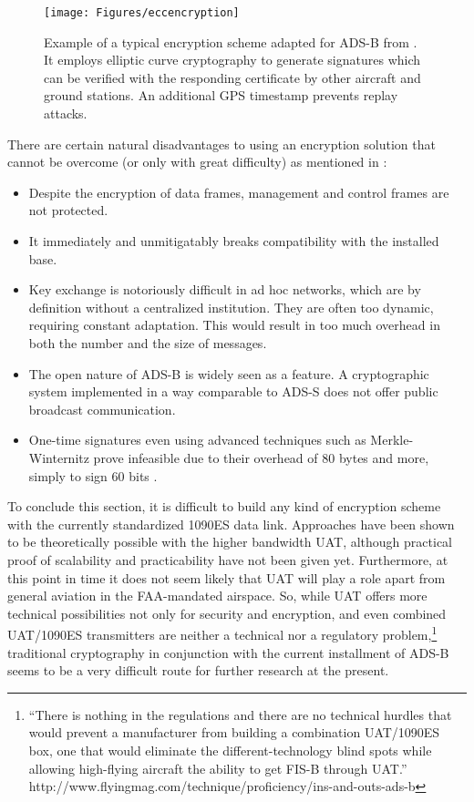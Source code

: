\documentclass[english]{IEEEtran}
\begin{document}
\begin{figure}
\texttt{[image: Figures/eccencryption]}

\caption{Example of a typical encryption scheme adapted for ADS-B from \cite{Ziliang2010}.
It employs elliptic curve cryptography to generate signatures which
can be verified with the responding certificate by other aircraft
and ground stations. An additional GPS timestamp prevents replay attacks.}
\end{figure}


There are certain natural disadvantages to using an encryption solution
that cannot be overcome (or only with great difficulty) as mentioned
in \cite{Zhang2010}: 
\begin{itemize}
\item Despite the encryption of data frames, management and control frames
are not protected.
\item It immediately and unmitigatably breaks compatibility with the installed
base. 
\item Key exchange is notoriously difficult in ad hoc networks, which are
by definition without a centralized institution. They are often too
dynamic, requiring constant adaptation. This would result in too much
overhead in both the number and the size of messages. 
\item The open nature of ADS-B is widely seen as a feature. A cryptographic
system implemented in a way comparable to ADS-S does not offer public
broadcast communication.
\item One-time signatures even using advanced techniques such as Merkle-Winternitz
prove infeasible due to their overhead of 80 bytes and more, simply
to sign 60 bits \cite{Luk2006}.
\end{itemize}
To conclude this section, it is difficult to build any kind of encryption
scheme with the currently standardized 1090ES data link. Approaches
have been shown to be theoretically possible with the higher bandwidth
UAT, although practical proof of scalability and practicability have
not been given yet. Furthermore, at this point in time it does not
seem likely that UAT will play a role apart from general aviation
in the FAA-mandated airspace. So, while UAT offers more technical
possibilities not only for security and encryption, and even combined
UAT/1090ES transmitters are neither a technical nor a regulatory problem,\footnote{``There is nothing in the regulations and there are no technical
hurdles that would prevent a manufacturer from building a combination
UAT/1090ES box, one that would eliminate the different-technology
blind spots while allowing high-flying aircraft the ability to get
FIS-B through UAT.'' http://www.flyingmag.com/technique/proficiency/ins-and-outs-ads-b} traditional cryptography in conjunction with the current installment
of ADS-B seems to be a very difficult route for further research at
the present.
\end{document}
